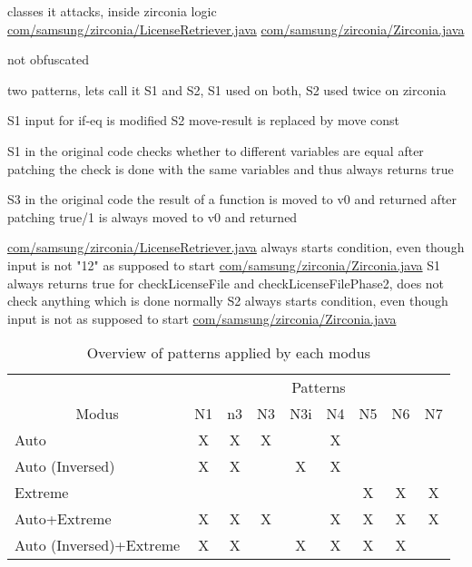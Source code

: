 classes it attacks, inside zirconia logic
\url{com/samsung/zirconia/LicenseRetriever.java}
\url{com/samsung/zirconia/Zirconia.java}

not obfuscated

two patterns, lets call it S1 and S2, S1 used on both, S2 used twice on zirconia



S1
input for if-eq is modified
S2
move-result is replaced by move const


S1
in the original code checks whether to different variables are equal
after patching the check is done with the same variables and thus always returns true

S3
in the original code the result of a function is moved to v0 and returned
after patching true/1 is always moved to v0 and returned



\url{com/samsung/zirconia/LicenseRetriever.java}
always starts condition, even though input is not "12" as supposed to start
\url{com/samsung/zirconia/Zirconia.java}
S1
always returns true for checkLicenseFile and checkLicenseFilePhase2, does not check anything which is done normally
S2
always starts condition, even though input is not as supposed to start
\url{com/samsung/zirconia/Zirconia.java}
\begin{table}[h]
\centering
\begin{tabular}{l|cccccccc}
                           & \multicolumn{8}{c}{Patterns}           \\
\multicolumn{1}{c|}{Modus} & N1 & n3 & N3 & N3i & N4 & N5 & N6 & N7 \\ \hline
Auto                       & X  & X  & X  &     & X  &    &    &    \\
Auto (Inversed)            & X  & X  &    & X   & X  &    &    &    \\
Extreme                    &    &    &    &     &    & X  & X  & X  \\
Auto+Extreme               & X  & X  & X  &     & X  & X  & X  & X  \\
Auto (Inversed)+Extreme    & X  & X  &    & X   & X  & X  & X  &
\end{tabular}
\caption{Overview of patterns applied by each modus}
\label{table:patterns}
\end{table}


